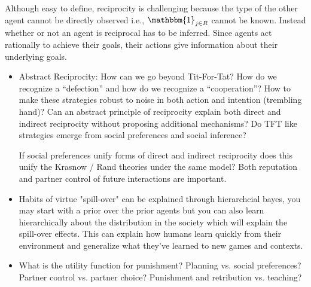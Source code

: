 \documentclass[doc, natbib]{apa6}
\theoremstyle{definition}
\begin{document}
Although easy to define, reciprocity is challenging because the type of the other agent cannot be directly observed i.e., $\mathbbm{1}_{j \in R}$ cannot be known. Instead whether or not an agent is reciprocal has to be inferred. Since agents act rationally to achieve their goals, their actions give information about their underlying goals. 



\begin{itemize}
\item Abstract Reciprocity: How can we go beyond Tit-For-Tat? How do we recognize a ``defection'' and how do we recognize a ``cooperation''? How to make these strategies robust to noise in both action and intention (trembling hand)? Can an abstract principle of reciprocity explain both direct and indirect reciprocity without proposing additional mechanisms? Do TFT like strategies emerge from social preferences and social inference?

If social preferences unify forms of direct and indirect reciprocity does this unify the Krasnow / Rand theories under the same model? Both reputation and partner control of future interactions are important. 
\item Habits of virtue "spill-over" can be explained through hierarchcial bayes, you may start with a prior over the prior agents but you can also learn hierarchically about the distribution in the society which will explain the spill-over effects. This can explain how humans learn quickly from their environment and generalize what they've learned to new games and contexts. 

\item What is the utility function for punishment? Planning vs. social preferences? Partner control vs. partner choice? Punishment and retribution vs. teaching? 

\end{itemize}
\end{document}
